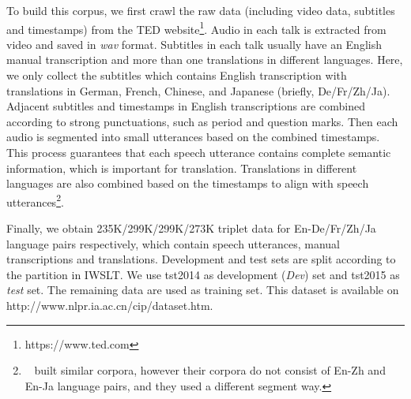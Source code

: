 \documentclass[letterpaper]{article} %
\begin{document}
To build this corpus, we first crawl the raw data (including video data, subtitles and timestamps) from the TED website\footnote{https://www.ted.com}. Audio in each talk is extracted from video and saved in \textit{wav} format. Subtitles in each talk usually have an English manual transcription and more than one translations in different languages. Here, we only collect the subtitles which contains English transcription with translations in German, French, Chinese, and Japanese (briefly, De/Fr/Zh/Ja). Adjacent subtitles and timestamps in English transcriptions are combined according to strong punctuations, such as period and question marks. Then each audio is segmented into small utterances based on the combined timestamps. This process guarantees that each speech utterance contains complete semantic information, which is important for translation. Translations in different languages are also combined based on the timestamps to align with speech utterances\footnote{\citeauthor{gangi2019must}~ built similar corpora, however their corpora do not consist of En-Zh and En-Ja language pairs, and they used a different segment way.}.

Finally, we obtain 235K/299K/299K/273K triplet data for En-De/Fr/Zh/Ja language pairs respectively, which contain speech utterances, manual transcriptions and translations. 
Development and test sets are split according to the partition in IWSLT. We use tst2014 as development (\textit{Dev})  set and tst2015 as \textit{test} set. The remaining data are used as training set. This dataset is available on http://www.nlpr.ia.ac.cn/cip/dataset.htm.
\end{document}
